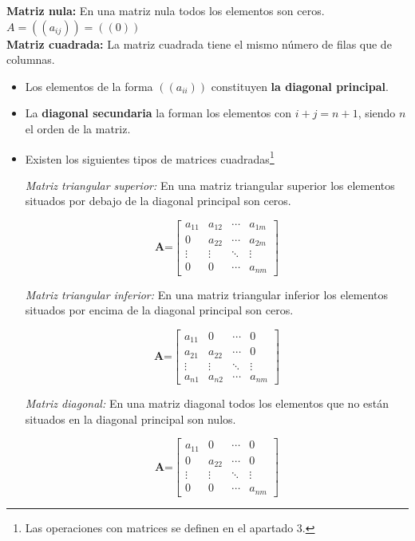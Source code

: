 \documentclass[10pt]{article}
\begin{document}
\textbf{Matriz nula:} En una matriz nula todos los elementos son ceros. $A = ((a_{ij})) = ((0))$ \\

\textbf{Matriz cuadrada:} La matriz cuadrada tiene el mismo número de filas que de columnas.

\begin{itemize}
\item Los elementos de la forma $((a_{ii}))$ constituyen \textbf{la diagonal principal}.
\item La \textbf{diagonal secundaria} la forman los elementos con $i + j = n + 1$, siendo $n$ el orden de la matriz.
\item Existen los siguientes tipos de matrices cuadradas\footnote{Las operaciones con matrices se definen en el apartado 3.}

\textit{Matriz triangular superior:} En una matriz triangular superior los elementos situados por debajo de la diagonal principal son ceros.

$$\textbf{A=}\begin{bmatrix}
a_{11} & a_{12} & \cdots & a_{1m} \\
0 & a_{22} & \cdots & a_{2m} \\
\vdots & \vdots & \ddots & \vdots \\
0 & 0 & \cdots & a_{nm}
\end{bmatrix}
$$

\textit{Matriz triangular inferior:} En una matriz triangular inferior los elementos situados por encima de la diagonal principal son ceros.

$$\textbf{A=}\begin{bmatrix}
a_{11} & 0 & \cdots & 0 \\
a_{21} & a_{22} & \cdots & 0 \\
\vdots & \vdots & \ddots & \vdots \\
a_{n1} & a_{n2} & \cdots & a_{nm}
\end{bmatrix}
$$

\textit{Matriz diagonal:} En una matriz diagonal todos los elementos que no están situados en la diagonal principal son nulos.

$$\textbf{A=}\begin{bmatrix}
a_{11} & 0 & \cdots & 0 \\
0 & a_{22}  & \cdots & 0 \\
\vdots & \vdots & \ddots & \vdots \\
0 & 0 & \cdots & a_{nm}
\end{bmatrix}
$$


\end{itemize}
\end{document}
